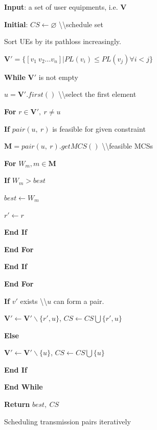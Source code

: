 {
\begin{algorithm}[t]
\setcounter{lines}{0}

\algline \textbf{Input}: a set of user equipments, i.e. $\mathbf{V}$

\algline \textbf{Initial}: $CS \leftarrow \varnothing$ \textbackslash\textbackslash schedule set

\algline Sort UEs by its pathloss increasingly.

\textbf{\quad{}\quad{}}$\mathbf{V'} = \{[v_1\medspace v_2 ... v_n] | PL(v_i) \leq PL(v_j) \forall i < j\}$

\algline \textbf{While } $\mathbf{V'}$ is not empty

\algline \textbf{\quad{}} $u = \mathbf{V'}.first()$ \textbackslash\textbackslash select the first element

\algline \textbf{\quad{}For } $r \in \mathbf{V'},\medspace r\neq u$

\algline \textbf{\quad{}}\textbf{\quad{}If } $pair(u,\medspace r)$ is feasible for given constraint

\algline \textbf{\quad{}}\textbf{\quad{}}\textbf{\quad{}} $\mathbf{M} =pair(u,\medspace r).getMCS()$ \textbackslash\textbackslash feasible MCSs

\algline \textbf{\quad{}}\textbf{\quad{}}\textbf{\quad{}For } $W_{m}, m\in \textbf{M}$

\algline \textbf{\quad{}}\textbf{\quad{}}\textbf{\quad{}}\textbf{\quad{}If } $W_{m} > best$

\algline \textbf{\quad{}}\textbf{\quad{}}\textbf{\quad{}}\textbf{\quad{}}\textbf{\quad{}} $best \leftarrow W_{m}$

\algline \textbf{\quad{}}\textbf{\quad{}}\textbf{\quad{}}\textbf{\quad{}}\textbf{\quad{}} $r' \leftarrow r$

\algline \textbf{\quad{}}\textbf{\quad{}}\textbf{\quad{}}\textbf{\quad{}End If}

\algline \textbf{\quad{}}\textbf{\quad{}}\textbf{\quad{}End For}

\algline \textbf{\quad{}}\textbf{\quad{}End If}

\algline \textbf{\quad{}End For}

\algline \textbf{\quad{}If } $v'$ exists \textbackslash\textbackslash $u$ can form a pair.

\algline \textbf{\quad{}}\textbf{\quad{}} $\mathbf{V'}\leftarrow \mathbf{V'}\backslash \{r', u\}$, $CS \leftarrow CS \bigcup \{r', u\}$

\algline \textbf{\quad{}Else }

\algline \textbf{\quad{}}\textbf{\quad{}} $\mathbf{V'}\leftarrow \mathbf{V'}\backslash \{u\}$, $CS \leftarrow CS \bigcup \{u\}$

\algline \textbf{\quad{}End If }

\algline \textbf{End While}

\algline \textbf{Return} $best,\medspace CS$

\caption{\label{alg_my} Scheduling transmission pairs iteratively}
\end{algorithm}
}

